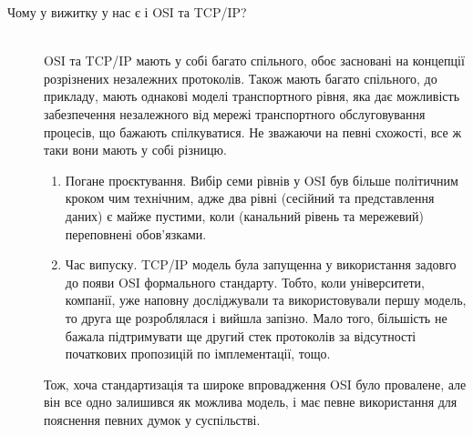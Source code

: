 \begin{description}
        \item[Чому у вижитку у нас є і OSI та TCP/IP?] \hfill \\
        OSI та TCP/IP мають у собі багато спільного, обоє засновані на концепції розрізнених незалежних протоколів. Також мають багато спільного, до прикладу, мають однакові моделі транспортного рівня, яка дає можливість забезпечення незалежного від мережі транспортного обслуговування процесів, що бажають спілкуватися. Не зважаючи на певні схожості, все ж таки вони мають у собі різницю.
        \begin{enumerate}
            \item Погане проєктування. Вибір семи рівнів у OSI був більше політичним кроком чим технічним, адже два рівні (сесійний та представлення даних) є майже пустими, коли (канальний рівень та мережевий) переповнені обов'язками.
            \item Час випуску. TCP/IP модель була запущенна у використання задовго до появи OSI формального стандарту. Тобто, коли університети, компанії, уже наповну досліджували та використовували першу модель, то друга ще розроблялася і вийшла запізно. Мало того, більшість не бажала підтримувати ще другий стек протоколів за відсутності початкових пропозицій по імплементації, тощо.
        \end{enumerate}
        Тож, хоча стандартизація та широке впровадження OSI було провалене, але він все одно залишився як можлива модель, і має певне використання для пояснення певних думок у суспільстві.
    \end{description}
